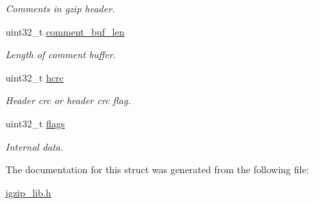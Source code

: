 \begin{DoxyCompactItemize}
\begin{DoxyCompactList}\small\item\em Comments in gzip header. \end{DoxyCompactList}\item 
\hypertarget{structisal__gzip__header_a8319310883f1ccbeeea470ee680c66cc}{uint32\-\_\-t \hyperlink{structisal__gzip__header_a8319310883f1ccbeeea470ee680c66cc}{comment\-\_\-buf\-\_\-len}}\label{structisal__gzip__header_a8319310883f1ccbeeea470ee680c66cc}

\begin{DoxyCompactList}\small\item\em Length of comment buffer. \end{DoxyCompactList}\item 
\hypertarget{structisal__gzip__header_a887c9cf4ad220fca36274129ab8b5e0f}{uint32\-\_\-t \hyperlink{structisal__gzip__header_a887c9cf4ad220fca36274129ab8b5e0f}{hcrc}}\label{structisal__gzip__header_a887c9cf4ad220fca36274129ab8b5e0f}

\begin{DoxyCompactList}\small\item\em Header crc or header crc flag. \end{DoxyCompactList}\item 
\hypertarget{structisal__gzip__header_a82a007737211be9e96fcd94e0540dd0f}{uint32\-\_\-t \hyperlink{structisal__gzip__header_a82a007737211be9e96fcd94e0540dd0f}{flags}}\label{structisal__gzip__header_a82a007737211be9e96fcd94e0540dd0f}

\begin{DoxyCompactList}\small\item\em Internal data. \end{DoxyCompactList}\end{DoxyCompactItemize}


The documentation for this struct was generated from the following file\-:\begin{DoxyCompactItemize}
\item 
\hyperlink{igzip__lib_8h}{igzip\-\_\-lib.\-h}\end{DoxyCompactItemize}
